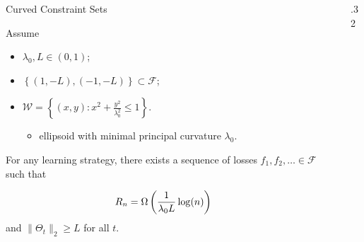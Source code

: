 \documentclass[final]{beamer} %
\newcommand{\cW}{\mathcal{W}}
\newcommand{\cF}{\mathcal{F}}
\newcommand{\seto}[1]{\left\{#1\right\}}
\begin{document}
\begin{frame}[c]
\begin{columns}[t,totalwidth=\textwidth]
\begin{column}{.32\textwidth}
\begin{block}{Curved Constraint Sets}
			\begin{tcolorbox}[title = \vspace{0.4cm}\textbf{\large Result II (Lower Bound)} \vspace{0.4cm}, title filled, width = 0.9\textwidth, colback = uofagreen!10, colframe = red, arc = 16pt]
			Assume
			\begin{itemize}
				\item  $\lambda_0,L \in (0,1)$;
				\item $\seto{(1,-L), (-1,-L)} \subset \cF$; 
				\item $\cW = \seto{(x,y): x^2 + \frac{y^2}{\lambda_0^2} \le 1}$.
				\begin{itemize}
					\item \small ellipsoid with minimal principal curvature $\lambda_0$.
				\end{itemize}
			\end{itemize}
			\bigskip
				For any learning strategy, there exists a sequence of losses $f_1,f_2,\ldots \in \cF$ such that 

				\[
				R_n = \Omega\left(\frac{1}{\lambda_0L} \log(n)\right) \bigskip
				\]				
				and $\|\Theta_t\|_2 \ge L$ for all $t$.
			\end{tcolorbox}

			

		\end{block}
	\end{column}
	\begin{column}{0.01\textwidth}
	\end{column}
	\begin{column} {.32\textwidth}
%			
%			
%		
%		
		

\end{column}
\end{columns}
\end{frame}
\end{document}
